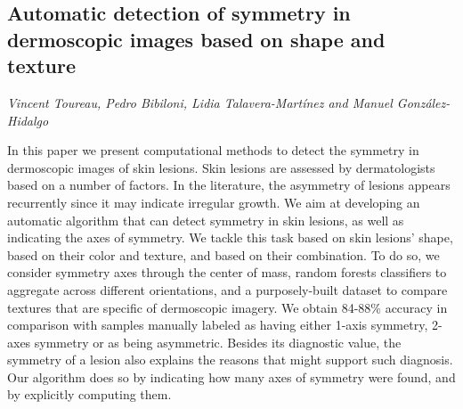 \documentclass[../booklet.tex]{subfiles}
\begin{document}
\subsection[Automatic detection of symmetry in dermoscopic images based on shape and texture. {\it Vincent Toureau, Pedro Bibiloni, Lidia Talavera-Martínez and Manuel González-Hidalgo}]{Automatic detection of symmetry in dermoscopic images based on shape and texture}
   

\begin{center}
  {\it Vincent Toureau, Pedro Bibiloni, Lidia Talavera-Martínez and Manuel González-Hidalgo}
\end{center}

\vskip 0.8cm


In this paper we present computational methods to detect the symmetry in dermoscopic images of skin lesions.
Skin lesions are assessed by dermatologists based on a number of factors.
In the literature, the asymmetry of lesions appears recurrently since it may indicate irregular growth.
We aim at developing an automatic algorithm that can detect symmetry in skin lesions, as well as indicating the axes of symmetry.
We tackle this task based on skin lesions' shape, based on their color and texture, and based on their combination.
To do so, we consider symmetry axes through the center of mass, random forests classifiers to aggregate across different orientations, and a purposely-built dataset to compare textures that are specific of dermoscopic imagery.
We obtain 84-88\% accuracy in comparison with samples manually labeled as having either 1-axis symmetry, 2-axes symmetry or as being asymmetric.
Besides its diagnostic value, the symmetry of a lesion also explains the reasons that might support such diagnosis.
Our algorithm does so by indicating how many axes of symmetry were found, and by explicitly computing them.

\end{document}
